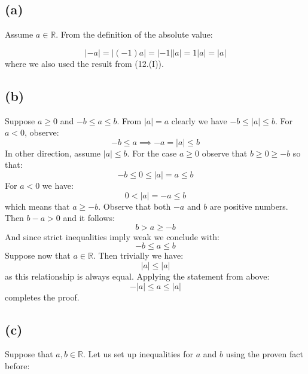 \documentclass{article}
\begin{document}
\subsection*{(a)}

Assume \(a \in \mathbb{R}\). From the definition of the absolute value:

\begin{equation*}
	|-a| = |(-1)a| = |-1||a| = 1|a| = |a|
\end{equation*}
where we also used the result from (12.(I)).

\subsection*{(b)}

Suppose \(a \geq 0\) and \(-b \leq a \leq b\). From \(|a| = a\) clearly we have \(-b \leq |a| \leq b\).
For \(a < 0\), observe:
\begin{equation*}
	-b \leq a \implies -a = |a| \leq b
\end{equation*}
\newline
In other direction, assume \(|a| \leq b\). For the case \(a \geq 0\) observe that \(b \geq 0 \geq -b\) so that:
\begin{equation*}
	-b \leq 0 \leq |a| = a \leq b
\end{equation*}
For \(a < 0\) we have:
\begin{equation*}
	0 < |a| = -a \leq b
\end{equation*}
which means that \(a \geq -b\). Observe that both \(-a\) and \(b\) are positive numbers. Then \(b - a > 0\) and it follows:
\begin{equation*}
	b > a \geq -b
\end{equation*}
And since strict inequalities imply weak we conclude with:
\begin{equation*}
	-b \leq a \leq b
\end{equation*}
Suppose now that \(a \in \mathbb{R}\). Then trivially we have:
\begin{equation*}
	|a| \leq |a|
\end{equation*}
as this relationship is always equal. Applying the statement from above:
\begin{equation*}
	-|a| \leq a \leq |a|
\end{equation*}
completes the proof.

\subsection*{(c)}
Suppose that \(a, b \in \mathbb{R}\). Let us set up inequalities for \(a\) and \(b\) using the proven fact before:
\end{document}
